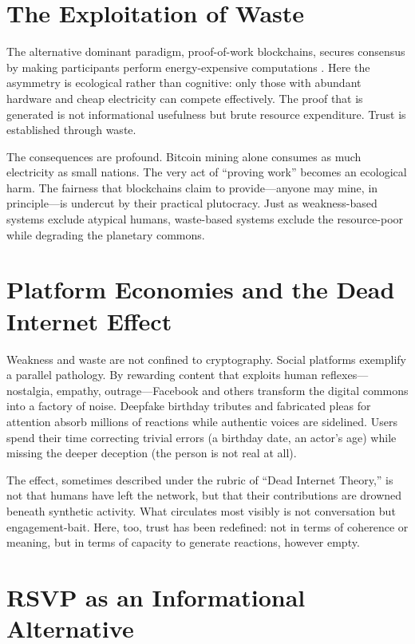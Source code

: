 \documentclass[openany]{book}
\begin{document}
\section{The Exploitation of Waste}

The alternative dominant paradigm, proof-of-work blockchains, secures consensus by making participants perform energy-expensive computations \cite{nakamoto2008}. Here the asymmetry is ecological rather than cognitive: only those with abundant hardware and cheap electricity can compete effectively. The proof that is generated is not informational usefulness but brute resource expenditure. Trust is established through waste.

The consequences are profound. Bitcoin mining alone consumes as much electricity as small nations. The very act of ``proving work'' becomes an ecological harm. The fairness that blockchains claim to provide—anyone may mine, in principle—is undercut by their practical plutocracy. Just as weakness-based systems exclude atypical humans, waste-based systems exclude the resource-poor while degrading the planetary commons.

\section{Platform Economies and the Dead Internet Effect}

Weakness and waste are not confined to cryptography. Social platforms exemplify a parallel pathology. By rewarding content that exploits human reflexes—nostalgia, empathy, outrage—Facebook and others transform the digital commons into a factory of noise. Deepfake birthday tributes and fabricated pleas for attention absorb millions of reactions while authentic voices are sidelined. Users spend their time correcting trivial errors (a birthday date, an actor’s age) while missing the deeper deception (the person is not real at all).

The effect, sometimes described under the rubric of ``Dead Internet Theory,'' is not that humans have left the network, but that their contributions are drowned beneath synthetic activity. What circulates most visibly is not conversation but engagement-bait. Here, too, trust has been redefined: not in terms of coherence or meaning, but in terms of capacity to generate reactions, however empty.

\section{RSVP as an Informational Alternative}
\end{document}
